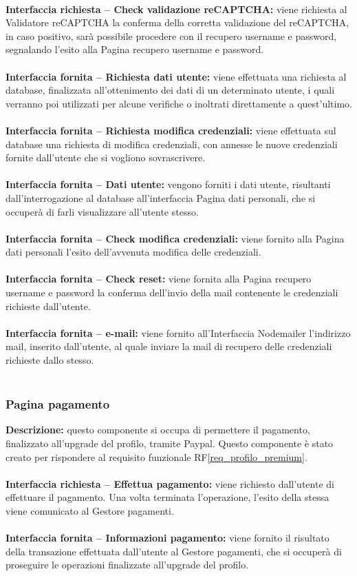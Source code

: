 \\
\textbf{Interfaccia richiesta – Check validazione reCAPTCHA:} viene richiesta al Validatore reCAPTCHA la conferma della corretta validazione del reCAPTCHA, in caso positivo, sarà possibile procedere con il recupero username e password, segnalando l’esito alla Pagina recupero username e password. \\
\\
\textbf{Interfaccia fornita – Richiesta dati utente:} viene effettuata una richiesta al database, finalizzata all’ottenimento dei dati di un determinato utente, i quali verranno poi utilizzati per alcune verifiche o inoltrati direttamente a quest’ultimo. \\
\\
\textbf{Interfaccia fornita – Richiesta modifica credenziali:} viene effettuata sul database una richiesta di modifica credenziali, con annesse le nuove credenziali fornite dall’utente che si vogliono sovrascrivere. \\
\\
\textbf{Interfaccia fornita – Dati utente:} vengono forniti i dati utente, risultanti dall’interrogazione al database all’interfaccia Pagina dati personali, che si occuperà di farli visualizzare all’utente stesso. \\
\\
\textbf{Interfaccia fornita – Check modifica credenziali:} viene fornito alla Pagina dati personali l’esito dell’avvenuta modifica delle credenziali. \\
\\
\textbf{Interfaccia fornita – Check reset:} viene fornita alla Pagina recupero username e password la conferma dell’invio della mail contenente le credenziali richieste dall’utente. \\
\\
\textbf{Interfaccia fornita – e-mail:} viene fornito all’Interfaccia Nodemailer l’indirizzo mail, inserito dall’utente, al quale inviare la mail di recupero delle credenziali richieste dallo stesso. \\
\\

\subsubsection{Pagina pagamento}
\textbf{Descrizione:} questo componente si occupa di permettere il pagamento, finalizzato all’upgrade del profilo, tramite Paypal. Questo componente è stato creato per rispondere al requisito funzionale RF\ref{req_profilo_premium}. \\
\\
\textbf{Interfaccia richiesta – Effettua pagamento:} viene richiesto dall’utente di effettuare il pagamento. Una volta terminata l’operazione, l’esito della stessa viene comunicato al Gestore pagamenti. \\
\\
\textbf{Interfaccia fornita – Informazioni pagamento:} viene fornito il risultato della transazione effettuata dall’utente al Gestore pagamenti, che si occuperà di proseguire le operazioni finalizzate all’upgrade del profilo.

